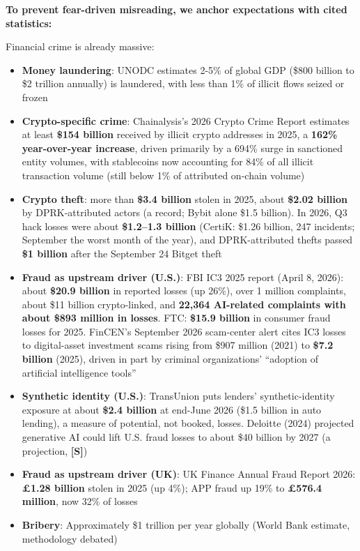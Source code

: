 \documentclass[11pt,letterpaper]{article}
\begin{document}
\begin{infobox}
\textbf{To prevent fear-driven misreading, we anchor expectations with cited statistics:}

Financial crime is already massive:
\begin{itemize}
  \item \textbf{Money laundering}: UNODC estimates 2-5\% of global GDP (\$800 billion to \$2 trillion annually) is laundered, with less than 1\% of illicit flows seized or frozen
  \item \textbf{Crypto-specific crime}: Chainalysis's 2026 Crypto Crime Report estimates at least \textbf{\$154 billion} received by illicit crypto addresses in 2025, a \textbf{162\% year-over-year increase}, driven primarily by a 694\% surge in sanctioned entity volumes, with stablecoins now accounting for 84\% of all illicit transaction volume (still below 1\% of attributed on-chain volume)
  \item \textbf{Crypto theft}: more than \textbf{\$3.4 billion} stolen in 2025, about \textbf{\$2.02 billion} by DPRK-attributed actors (a record; Bybit alone \$1.5 billion). In 2026, Q3 hack losses were about \textbf{\$1.2--1.3 billion} (CertiK: \$1.26 billion, 247 incidents; September the worst month of the year), and DPRK-attributed thefts passed \textbf{\$1 billion} after the September 24 Bitget theft
  \item \textbf{Fraud as upstream driver (U.S.)}: FBI IC3 2025 report (April 8, 2026): about \textbf{\$20.9 billion} in reported losses (up 26\%), over 1 million complaints, about \$11 billion crypto-linked, and \textbf{22,364 AI-related complaints with about \$893 million in losses}. FTC: \textbf{\$15.9 billion} in consumer fraud losses for 2025. FinCEN's September 2026 scam-center alert cites IC3 losses to digital-asset investment scams rising from \$907 million (2021) to \textbf{\$7.2 billion} (2025), driven in part by criminal organizations' ``adoption of artificial intelligence tools''
  \item \textbf{Synthetic identity (U.S.)}: TransUnion puts lenders' synthetic-identity exposure at about \textbf{\$2.4 billion} at end-June 2026 (\$1.5 billion in auto lending), a measure of potential, not booked, losses. Deloitte (2024) projected generative AI could lift U.S. fraud losses to about \$40 billion by 2027 (a projection, \textbf{[S]})
  \item \textbf{Fraud as upstream driver (UK)}: UK Finance Annual Fraud Report 2026: \textbf{\pounds1.28 billion} stolen in 2025 (up 4\%); APP fraud up 19\% to \textbf{\pounds576.4 million}, now 32\% of losses
  \item \textbf{Bribery}: Approximately \$1 trillion per year globally (World Bank estimate, methodology debated)
\end{itemize}


\end{infobox}
\end{document}
